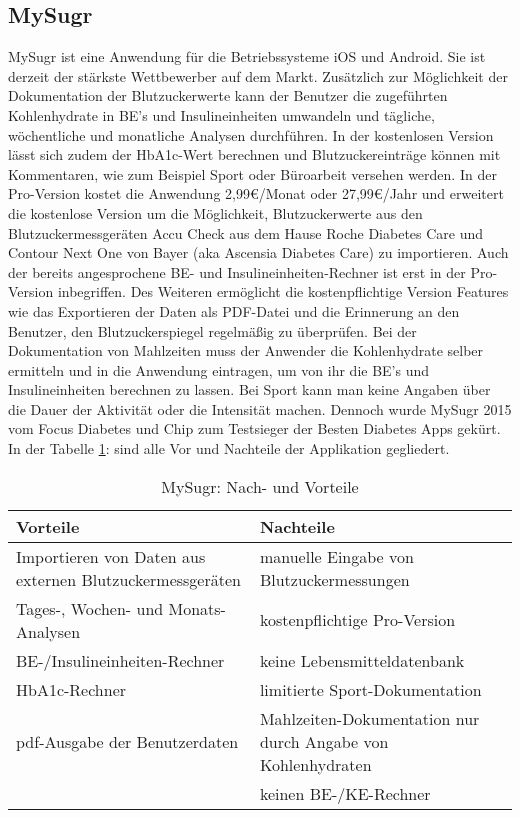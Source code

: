 	\subsection{MySugr}
	MySugr ist eine Anwendung für die Betriebssysteme iOS und Android. Sie ist derzeit der stärkste Wettbewerber auf dem Markt. Zusätzlich zur Möglichkeit der Dokumentation der Blutzuckerwerte kann der Benutzer die zugeführten Kohlenhydrate in BE's und Insulineinheiten umwandeln und tägliche, wöchentliche und monatliche Analysen durchführen. In der kostenlosen Version lässt sich zudem der HbA1c-Wert berechnen und Blutzuckereinträge können mit Kommentaren, wie zum Beispiel \glqq Sport\grqq{} oder \glqq Büroarbeit\grqq{} versehen werden. In der Pro-Version kostet die Anwendung 2,99\euro{}/Monat oder 27,99\euro{}/Jahr und erweitert die kostenlose Version um die Möglichkeit, Blutzuckerwerte aus den Blutzuckermessgeräten \glqq Accu Check\grqq{} aus dem Hause Roche Diabetes Care und \glqq Contour Next One\grqq{} von Bayer (aka Ascensia Diabetes Care) zu importieren. Auch der bereits angesprochene BE- und Insulineinheiten-Rechner ist erst in der Pro-Version inbegriffen. Des Weiteren ermöglicht die kostenpflichtige Version Features wie das Exportieren der Daten als PDF-Datei und die Erinnerung an den Benutzer, den Blutzuckerspiegel regelmäßig zu überprüfen. Bei der Dokumentation von Mahlzeiten muss der Anwender die Kohlenhydrate selber ermitteln und in die Anwendung eintragen, um von ihr die BE’s und Insulineinheiten berechnen zu lassen. Bei Sport kann man keine Angaben über die Dauer der Aktivität oder die Intensität machen. Dennoch wurde MySugr 2015 vom Focus Diabetes und Chip zum Testsieger der \glqq Besten Diabetes Apps\grqq{} gekürt. In der Tabelle \ref{tab:MySugr}: \glqq {}\grqq{} sind alle Vor und Nachteile der Applikation gegliedert. \cite{MS}
	\begin{table}[H]
		\setlength{\tabcolsep}{12pt}
		\centering
		\begin{tabular}{p{6cm}|p{6cm}}
			\toprule
			\textbf{Vorteile} & \textbf{Nachteile}\\
			\hline
			Importieren von Daten aus externen Blutzuckermessgeräten & manuelle Eingabe von Blutzuckermessungen\\
			\hline
			Tages-, Wochen- und Monats-Analysen & kostenpflichtige Pro-Version\\
			\hline
			BE-/Insulineinheiten-Rechner & keine Lebensmitteldatenbank\\
			\hline
			HbA1c-Rechner & limitierte Sport-Dokumentation\\
			\hline
			pdf-Ausgabe der Benutzerdaten & Mahlzeiten-Dokumentation nur durch Angabe von Kohlenhydraten\\
			\hline
			& keinen BE-/KE-Rechner\\
			\bottomrule
		\end{tabular}
		\captionsetup{justification=centering}
		\caption{MySugr: Nach- und Vorteile}
		\label{tab:MySugr}
	\end{table}
